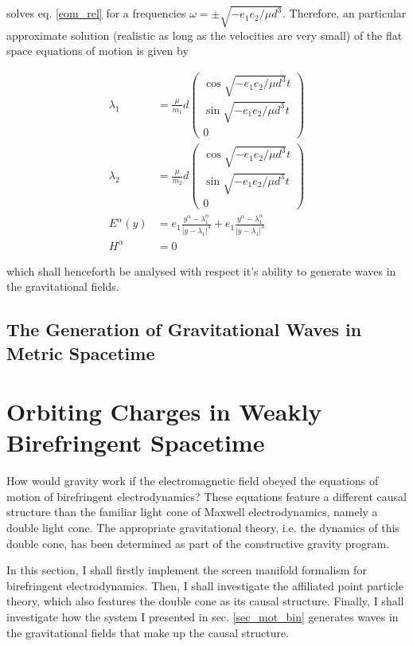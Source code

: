 \documentclass[11pt]{article}
\begin{document}
solves eq. \ref{eom_rel} for a frequencies $\omega = \pm \sqrt{- e_1 e_2 / \mu d^3}$. Therefore, an particular approximate solution (realistic as long as the velocities are very small) of the flat space equations of motion is given by

\begin{align}
	\lambda_1 &= \frac{\mu}{m_1}
	d\begin{pmatrix}
	\cos{\sqrt{- e_1 e_2 / \mu d^3} t}\\ \sin{\sqrt{- e_1 e_2 / \mu d^3} t}\\ 0
	\end{pmatrix}\\
	\lambda_2 &= \frac{\mu}{m_2}
	d\begin{pmatrix}
	\cos{\sqrt{- e_1 e_2 / \mu d^3} t}\\ \sin{\sqrt{- e_1 e_2 / \mu d^3} t}\\ 0
	\end{pmatrix}\\
	E^\alpha \left( y \right) &= 
	e_1 \frac{y^\alpha - \lambda_1^\alpha }{\left| y - \lambda_1\right|^3} 
	+ e_1 \frac{y^\alpha - \lambda_1^\alpha }{\left| y - \lambda_1\right|^3} \\
	H^\alpha &= 0 
\end{align}

which shall henceforth be analysed with respect it's ability to generate waves in the gravitational fields.


\subsection{The Generation of Gravitational Waves in Metric Spacetime}



\section{Orbiting Charges in Weakly Birefringent Spacetime}

How would gravity work if the electromagnetic field obeyed the equations of motion of birefringent electrodynamics? These equations feature a different causal structure than the familiar light cone of Maxwell electrodynamics, namely a double light cone. The appropriate gravitational theory, i.e. the  dynamics of this double cone, has been determined as part of the constructive gravity program.

In this section, I shall firstly implement the screen manifold formalism for birefringent electrodynamics. Then, I shall investigate the affiliated point particle theory, which also features the double cone as its causal structure. Finally, I shall investigate how the system I presented in sec. \ref{sec_mot_bin} generates waves in the gravitational fields that make up the causal structure.
\end{document}

